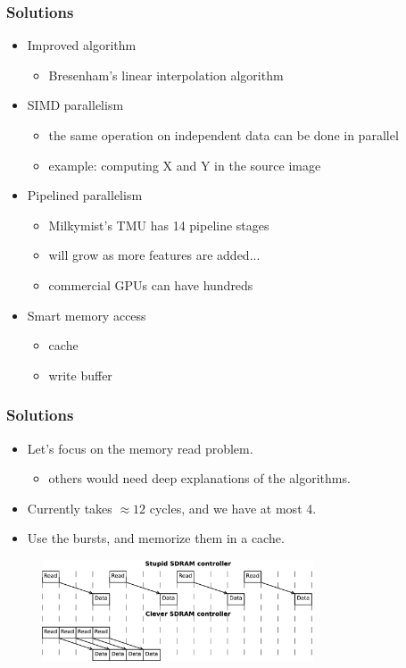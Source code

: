 \documentclass{beamer}
\begin{document}
\frame
{
  \frametitle{Solutions}
  
  \begin{itemize}
  \item Improved algorithm
  \begin{itemize}
  \item Bresenham's linear interpolation algorithm
  \end{itemize}
  \item SIMD parallelism
  \begin{itemize}
  \item the same operation on independent data can be done in parallel
  \item example: computing X and Y in the source image
  \end{itemize}
  \item Pipelined parallelism
  \begin{itemize}
  \item Milkymist's TMU has 14 pipeline stages
  \item will grow as more features are added...
  \item commercial GPUs can have hundreds
  \end{itemize}
  \item Smart memory access
  \begin{itemize}
  \item cache
  \item write buffer
  \end{itemize}
  \end{itemize}
}

\frame
{
  \frametitle{Solutions}
  
  \begin{itemize}
  \item Let's focus on the memory read problem.
  \begin{itemize}
  \item others would need deep explanations of the algorithms.
  \end{itemize}
  \item Currently takes $\approx12$ cycles, and we have at most 4.
  \item Use the bursts, and memorize them in a cache.
  \end{itemize}
  \begin{figure}[H]
  \includegraphics[height=30mm]{memlatency.eps}
  \end{figure}
}
\end{document}
